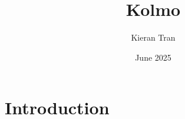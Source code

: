 \documentclass{article}
\title{Kolmo}
\author{Kieran Tran}
\date{June 2025}
\begin{document}
\maketitle

\section{Introduction}
\end{document}
